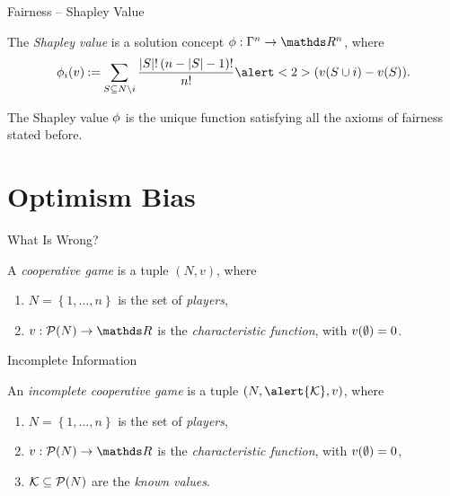 \documentclass[aspectratio=169]{beamer}
\begin{document}
\begin{frame}{Fairness -- Shapley Value}
	\begin{definition}
		The \emph{Shapley value} is a solution concept $ \Shapley: \Gamma^n \to \R^n $, where \[
			\shapley[i]v \deq \sum_{S \subseteq N \setminus i}^{} \frac{\absolute S! \left( n-\absolute S-1 \right)!}{n!} \alert<2>{\left( \fce{v}{S \cup i} - \fce{v}{S} \right)}.
		\]
	\end{definition}

	\begin{theorem}[Shapley]
		The Shapley value $ \phi $ is the \alert<1>{unique} function satisfying all the axioms of fairness stated before.
	\end{theorem}
\end{frame}

\section{Optimism Bias}

\begin{frame}{What Is Wrong?}
	\begin{definition}
		A \emph{cooperative game} is a tuple $ \left( N,v \right) $, where \begin{enumerate}
			\item $ N = \left\{ 1, \ldots, n \right\} $ is the set of \emph{players},
			\item $ v: \pot N \to \R $ is the \emph{characteristic function}, with $ v\!\left(\emptyset\right) = 0 $.
		\end{enumerate}
	\end{definition}
\end{frame}

\begin{frame}{Incomplete Information}
	\begin{definition}
		An \emph{incomplete cooperative game} is a tuple $ \left( N,\alert{\k},v \right) $, where \begin{enumerate}
			\item $ N = \left\{ 1, \ldots, n \right\} $ is the set of \emph{players},
			\item $ v: \pot N \to \R $ is the \emph{characteristic function}, with $ v\!\left(\emptyset\right) = 0 $,
			\item \alert{$ \mathcal{K} \subseteq \mathcal{P}\!\left(N\right) $ are the \emph{known values}.}
		\end{enumerate}
	\end{definition}
\end{frame}
\end{document}
